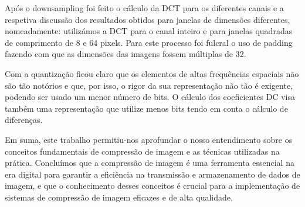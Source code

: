 \documentclass{article}
\begin{document}
Após o downsampling foi feito o cálculo da DCT para os diferentes canais e a respetiva discussão dos resultados obtidos para janelas de dimensões diferentes, nomeadamente: utilizámos a DCT para o canal inteiro e para janelas quadradas de comprimento de 8 e 64 pixels. Para este processo foi fulcral o uso de padding fazendo com que as dimensões das imagens fossem múltiplas de 32.

Com a quantização ficou claro que os elementos de altas frequências espaciais não são tão notórios e que, por isso, o rigor da sua representação não tão é exigente, podendo ser usado um menor número de bits. O cálculo dos coeficientes DC visa também uma representação que utilize menos bits tendo em conta o cálculo de diferenças.

Em suma, este trabalho permitiu-nos aprofundar o nosso entendimento sobre os conceitos fundamentais de compressão de imagem e as técnicas utilizadas na prática. Concluímos que a compressão de imagem é uma ferramenta essencial na era digital para garantir a eficiência na transmissão e armazenamento de dados de imagem, e que o conhecimento desses conceitos é crucial para a implementação de sistemas de compressão de imagem eficazes e de alta qualidade.
\end{document}
